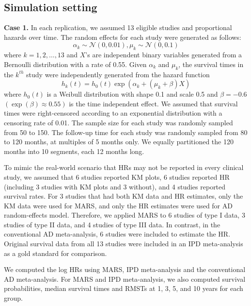 \documentclass[12pt]{article}
\theoremstyle{mystyle}
\begin{document}
\subsection{\label{sec:5:1} Simulation setting}
\noindent\textbf{Case 1.} \hspace{\parindent}
In each replication, we assumed 13 eligible studies and proportional hazards over time. The random effects for each study were generated as follows:
$$\alpha_k \sim \mathcal N(0,0.01), \mu_k \sim \mathcal N(0,0.1)$$
where $k=1,2,\dots,13$ and $X$'s are independent binary variables generated from a Bernoulli distribution with a rate of 0.55. Given $\alpha_k$ and $\mu_k$, the survival times in the $k^{th}$ study were independently generated from the hazard function 
$$h_k(t)=h_0(t)\exp(\alpha_k+(\mu_k+\beta)X)$$
where $h_0(t)$ is a Weibull distribution with shape 0.1 and scale 0.5 and $\beta=-0.6$ $(\exp(\beta)\approx0.55)$ is the time independent effect.  We assumed that survival times were right-censored according to an exponential distribution with a censoring rate of 0.01. The sample size for each study was randomly sampled from 50 to 150. The follow-up time for each study was randomly sampled from 80 to 120 months, at multiples of 5 months only. We equally partitioned the 120 months into 10 segments, each 12 months long.

To mimic the real-world scenario that HRs may not be reported in every clinical study, %
we assumed that 6 studies reported KM plots, 6 studies reported HR (including 3 studies with KM plots and 3 without), and 4 studies reported survival rates. For 3 studies that had both KM data and HR estimates, only the KM data were used for MARS, and only the HR estimates were used for AD random-effects model.  Therefore, we applied MARS to 6 studies of type I data, 3 studies of type II data, and 4 studies of type III data. In contrast, in the conventional AD meta-analysis, 6 studies were included to estimate the HR. Original survival data from all 13 studies were included in an IPD meta-analysis as a gold standard for comparison. 

We computed the log HRs using MARS, IPD meta-analysis and the conventional AD meta-analysis. 
For MARS and IPD meta-analysis, we also computed survival probabilities, median survival times and RMSTs at 1, 3, 5, and 10 years for each group. 
\end{document}
